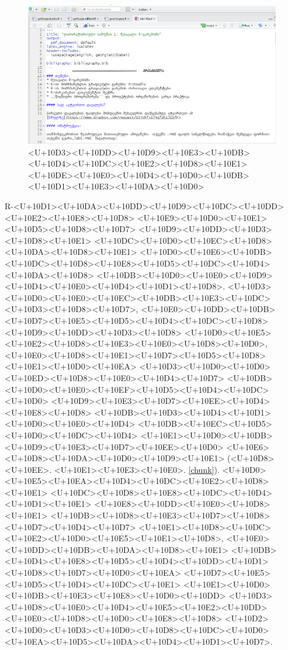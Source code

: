\documentclass{article}
\begin{document}
\begin{figure}[h]
\centering
\includegraphics[width=\textwidth]{img/preamble.PNG}
\caption{<U+10D3><U+10DD><U+10D9><U+10E3><U+10DB><U+10D4><U+10DC><U+10E2><U+10D8><U+10E1> <U+10DE><U+10E0><U+10D4><U+10D0><U+10DB><U+10D1><U+10E3><U+10DA><U+10D0>}
    \label{preamble}
\end{figure}

R-<U+10D1><U+10DA><U+10DD><U+10D9><U+10DC><U+10DD><U+10E2><U+10E8><U+10D8> <U+10E9><U+10D0><U+10E1><U+10D5><U+10D8><U+10D7> <U+10D9><U+10DD><U+10D3><U+10D8><U+10E1> <U+10DC><U+10D0><U+10EC><U+10D8><U+10DA><U+10D8><U+10E1> <U+10D0><U+10E6><U+10DB><U+10DC><U+10D8><U+10E8><U+10D5><U+10DC><U+10D4><U+10DA><U+10D8> <U+10DB><U+10D0><U+10E0><U+10D9><U+10D4><U+10E0><U+10D4><U+10D1><U+10D8>. <U+10D3><U+10D0><U+10E0><U+10EC><U+10DB><U+10E3><U+10DC><U+10D3><U+10D8><U+10D7>, <U+10E0><U+10DD><U+10DB> <U+10D7><U+10E5><U+10D5><U+10D4><U+10DC><U+10D8> <U+10D9><U+10DD><U+10D3><U+10D8> <U+10D0><U+10E5><U+10E2><U+10D8><U+10E3><U+10E0><U+10D8><U+10D0>, <U+10E0><U+10D8><U+10E1><U+10D7><U+10D5><U+10D8><U+10E1><U+10D0><U+10EA> <U+10D3><U+10D0><U+10D0><U+10ED><U+10D8><U+10E0><U+10D4><U+10D7> <U+10DB><U+10D0><U+10E0><U+10EF><U+10D5><U+10D4><U+10DC><U+10D0> <U+10D9><U+10E3><U+10D7><U+10EE><U+10D4><U+10E8><U+10D8> <U+10DB><U+10D3><U+10D4><U+10D1><U+10D0><U+10E0><U+10D4> <U+10DB><U+10EC><U+10D5><U+10D0><U+10DC><U+10D4> <U+10E1><U+10D0><U+10DB><U+10D9><U+10E3><U+10D7><U+10EE><U+10D0> <U+10E6><U+10D8><U+10DA><U+10D0><U+10D9><U+10E1> (<U+10D8><U+10EE>. <U+10E1><U+10E3><U+10E0>. \ref{chunk}). <U+10D0><U+10E5><U+10EA><U+10D4><U+10DC><U+10E2><U+10D8><U+10E1> <U+10DC><U+10D8><U+10E8><U+10DC><U+10D4><U+10D1><U+10E1> <U+10E8><U+10DD><U+10E0><U+10D8><U+10E1> <U+10DB><U+10D8><U+10E3><U+10D7><U+10D8><U+10D7><U+10D4><U+10D7> <U+10E1><U+10D8><U+10DC><U+10E2><U+10D0><U+10E5><U+10E1><U+10D8>, <U+10E0><U+10DD><U+10DB><U+10DA><U+10D8><U+10E1> <U+10DB><U+10D4><U+10E8><U+10D5><U+10D4><U+10DD><U+10D1><U+10D8><U+10D7><U+10D0><U+10EA> <U+10D7><U+10E5><U+10D5><U+10D4><U+10DC><U+10E1> <U+10E1><U+10D0><U+10DB><U+10E3><U+10E8><U+10D0><U+10DD> <U+10D3><U+10D8><U+10E0><U+10D4><U+10E5><U+10E2><U+10DD><U+10E0><U+10D8><U+10D0><U+10E8><U+10D8> <U+10D2><U+10D0><U+10D3><U+10D0><U+10D8><U+10DC><U+10D0><U+10EA><U+10D5><U+10DA><U+10D4><U+10D1><U+10D7>.
\end{document}
